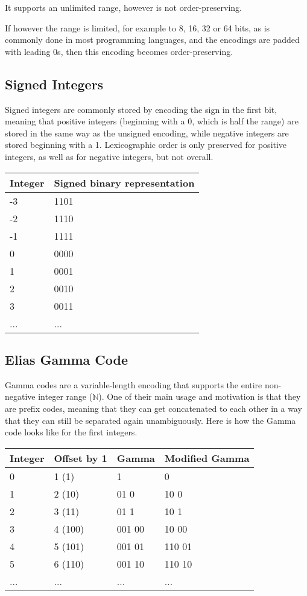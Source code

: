 \documentclass[final,leqno,onefignum,onetabnum]{siamltex1213}
\begin{document}
It supports an unlimited range, however is not order-preser\-ving.

If however the range is limited, for example to 8, 16, 32 or 64 bits, as is commonly done in most programming languages, and the encodings are padded with leading 0s, then this encoding becomes order-preserving.

\subsection{Signed Integers}

Signed integers are commonly stored by encoding the sign in the first bit, meaning that positive integers (beginning with a 0, which is half the range) are stored in the same way as the unsigned encoding, while negative integers are stored beginning with a 1. Lexicographic order is only preserved for positive integers, as well as for negative integers, but not overall.

\begin{tabular}{|l|l|}
\hline
Integer & Signed binary representation \\
\hline
-3 & 1101 \\
\hline
-2 & 1110 \\
\hline
-1 & 1111 \\
\hline
0 & 0000 \\
\hline
1 & 0001 \\
\hline
2 & 0010 \\
\hline
3 & 0011 \\
\hline
... & ... \\
\hline
\end{tabular}


\subsection{Elias Gamma Code}
\label{section-gamma-code}

Gamma codes are a variable-length encoding that supports the entire non-negative integer range ($\mathbb{N}$). One of their main usage and motivation is that they are prefix codes, meaning that they can get concatenated to each other in a way that they can still be separated again unambiguously. Here is how the Gamma code looks like for the first integers.


\begin{tabular}{|l|l|l|l|}
\hline
Integer & Offset by 1 & Gamma & Modified Gamma \\
\hline
0 & 1 (1) & 1 & 0\\
\hline
1 & 2 (10) & 01 0 & 10 0 \\
\hline
2 & 3 (11) & 01 1  & 10 1\\
\hline
3 & 4 (100) & 001 00 & 10 00\\
\hline
4 & 5 (101) & 001 01 & 110 01\\
\hline
5 & 6 (110) & 001 10 & 110 10\\
\hline
... & ... & ... & ... \\
\hline
\end{tabular}
\end{document}
